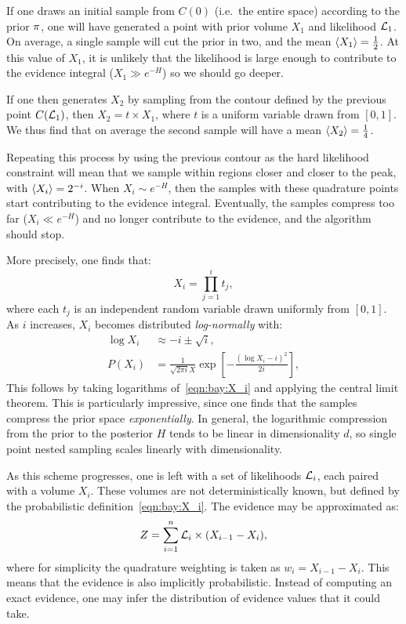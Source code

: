 If one draws an initial sample from \(C(0)\) (i.e.\ the entire space) according to the prior \(\pi\), one will have generated a point with prior volume \(X_1\) and likelihood \(\mathcal{L}_1\). On average, a single sample will cut the prior in two, and the mean \({\left\langle{X_1}\right\rangle}=\frac{1}{2}\). At this value of \(X_1\), it is unlikely that the likelihood is large enough to contribute to the evidence integral (\(X_1\gg e^{-H}\)) so we should go deeper.

If one then generates \(X_2\) by sampling from the contour defined by the previous point \(C(\mathcal{L}_1)\), then \(X_2=t\times X_1\), where \(t\) is a uniform variable drawn from \([0,1]\). We thus find that on average the second sample will have a mean \({\left\langle{X_2}\right\rangle} = \frac{1}{4}\). 

Repeating this process by using the previous contour as the hard likelihood constraint will mean that we sample within regions closer and closer to the peak, with \({\left\langle{X_i}\right\rangle} = 2^{-i}\). When \(X_i\sim e^{-H}\), then the samples with these quadrature points start contributing to the evidence integral. Eventually, the samples compress too far (\(X_i\ll e^{-H}\)) and no longer contribute to the evidence, and the algorithm should stop.

More precisely, one finds that:
\begin{equation}
  X_i = \prod_{j=1}^i t_j,
  \label{eqn:bay:X_i}
\end{equation}
where each \(t_j\) is an independent random variable drawn uniformly from \([0,1]\). As \(i\) increases, \(X_i\) becomes distributed {\em log-normally\/} with:
\begin{align}
  \log X_i  &\approx -i \pm \sqrt{i},
  \label{eqn:bay:log_normal_1_1}
  \\
  P(X_i) &= \frac{1}{\sqrt{2\pi i} X}\exp\left[ -\frac{{\left( \log X_i - i \right)}^2}{2 i}  \right],
  \label{eqn:bay:log_normal_1_2}
\end{align}
This follows by taking logarithms of~\eqref{eqn:bay:X_i} and applying the central limit theorem. This is particularly impressive, since one finds that the samples compress the prior space {\em exponentially}. In general, the logarithmic compression from the prior to the posterior \(H\) tends to be linear in dimensionality \(d\), so single point nested sampling scales linearly with dimensionality.

As this scheme progresses, one is left with a set of likelihoods \(\mathcal{L}_i\), each paired with a volume \(X_i\). These volumes are not deterministically known, but defined by the probabilistic definition~\eqref{eqn:bay:X_i}. The evidence may be approximated as:
\begin{equation}
  Z = \sum_{i=1}^n \mathcal{L}_i \times (X_{i-1}-X_{i}),
  \label{eqn:bay:ev_sum}
\end{equation}
where for simplicity the quadrature weighting is taken as \(w_i = X_{i-1}-X_i\). This means that the evidence is also implicitly probabilistic. Instead of computing an exact evidence, one may infer the distribution of evidence values that it could take.

